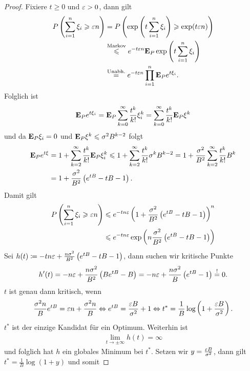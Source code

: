 \begin{proof}
Fixiere $t \ge 0$ und $\varepsilon > 0$, dann gilt
\begin{align*}
P\left(\sum_{i=1}^n \xi_i \geqslant \varepsilon n \right)
&= 
P\left(\exp\left(t\sum_{i=1}^n \xi_i\right) \geqslant \exp(t\varepsilon n) \right)\\
&\overset{\text{Markov}}{\leqslant}
e^{-t\varepsilon n}\textbf{E}_P \exp\left(t\sum_{i=1}^n \xi_i \right)\\
&\overset{\text{Unabh.}}{=}
e^{-t\varepsilon n} \prod_{i=1}^n \textbf{E}_P e^{t\xi_i}.
\end{align*}
Folglich ist
\begin{align*}
\textbf{E}_P e^{t\xi_i} = \textbf{E}_P \sum_{k=0}^\infty \frac{t^k}{k!}\xi_i^k
= \sum_{k=0}^\infty \frac{t^k}{k!}\textbf{E}_P\xi^k
\end{align*}
und da $\textbf{E}_P \xi_i = 0$ und $\textbf{E}_P \xi^k \leqslant \sigma^2 B^{k-2}$ folgt
\begin{align*}
\textbf{E}_P e^{t\xi} &= 1 + \sum_{k=2}^\infty \frac{t^k}{k!}\textbf{E}_P \xi_i^k
\leqslant 1 + \sum_{k=2}^\infty \frac{t^k}{k!}\sigma^k B^{k-2}
= 1 + \frac{\sigma^2}{B^2}\sum_{k=2}^\infty \frac{t^k}{k!}B^k\\
&= 1 + \frac{\sigma^2}{B^2}\left(e^{tB} -tB-1\right).
\end{align*}
Damit gilt
\begin{align*}
P\left(\sum_{i=1}^n \xi_i \geqslant \varepsilon n \right)
&\leqslant e^{-tn \varepsilon}
\left( 1+ \frac{\sigma^2}{B^2}\left(e^{tB}-tB-1\right) \right)^n\\
&\leqslant
e^{-tn \varepsilon}
\exp\left( n\frac{\sigma^2}{B^2}\left(e^{tB}-tB-1\right) \right)
\end{align*}
Sei $h(t)\coloneq - t n \varepsilon + \frac{n\sigma^2}{B^2}\left(e^{tB}-tB-1\right)$, dann
suchen wir kritische Punkte
\begin{align*}
h'(t) = -n \varepsilon + \frac{n\sigma^2}{B^2}\left(Be^{tB}-B\right)
= -n \varepsilon + \frac{n\sigma^2}{B}\left(e^{tB}-1\right)
\overset{!}{=} 0.
\end{align*}
$t$ ist genau dann kritisch, wenn
\begin{align*}
\frac{\sigma^2n}{B} e^{tB} = \varepsilon n + \frac{\sigma^2 n}{B}
\Leftrightarrow
e^{tB} = \frac{\varepsilon B}{\sigma^2} + 1
\Leftrightarrow
t^* = \frac{1}{B}\log\left( 1+ \frac{\varepsilon B}{\sigma^2}\right).
\end{align*}
$t^*$ ist der einzige Kandidat für ein Optimum. Weiterhin ist
\begin{align*}
\lim\limits_{t\to\pm\infty} h(t) = \infty
\end{align*}
und folglich hat $h$ ein globales Minimum bei $t^*$. Setzen wir $y=\frac{\varepsilon
B}{\sigma^2}$, dann gilt $t^*=\frac{1}{B}\log(1+y)$ und somit

\end{proof}
